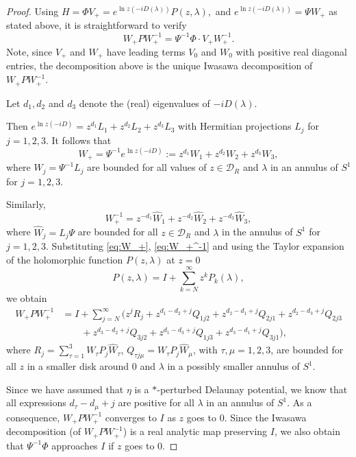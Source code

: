 \documentclass[a4paper,11pt]{amsart}
\theoremstyle{definition}
\numberwithin{equation}{section}
\begin{document}
\begin{proof}
Using  $H=\Phi V_+ =  e^{\ln z (-iD(\lambda))} P(z,\lambda),$ and 
$e^{\ln z (-iD(\lambda))}=\Psi W_+$ 
as  stated above, it is straightforward to verify
\begin{equation}\label{eq:4.8.2}
W_+PW_+^{-1}=\Psi^{-1}\Phi \cdot V_+W_+^{-1}.
\end{equation}
Note, since $V_+$ and $W_+$ have leading terms $V_0$ and $W_0$ with positive real diagonal entries, the decomposition above is the unique 
Iwasawa decomposition of $W_+PW_+^{-1}$.
 
Let  $d_1, d_2$ and $d_3$ denote the (real) eigenvalues of $-i D(\lambda).$

Then $e^{\ln z (-iD)}=z^{d_1}L_1+z^{d_2}L_2+z^{d_3}L_3$  with  Hermitian projections $L_j$ for $j=1,2,3$. 
It follows that 
\begin{equation}\label{eq:W_+}
W_+=\Psi^{-1}e^{\ln z (-iD)}:=z^{d_1}W_1+z^{d_2}W_2+z^{d_3}W_3,
\end{equation}
 where $W_j=\Psi^{-1}L_j$ are bounded for all values of $z\in\mathcal{D}_R$ and $\lambda$ in an annulus of $S^1$ for $j=1, 2, 3$. 
 
 Similarly, 
\begin{equation}\label{eq:W_+^-1}
W_+^{-1}=z^{-d_1} \hat{W}_1+z^{-d_2} \hat{W}_2+z^{-d_3} \hat{W}_3, 
\end{equation}
where $\hat{W}_j=L_j\Psi $ are bounded for all $z\in \mathcal{D}_R$ and $\lambda$ in the annulus of  $S^1$ for $j=1,2,3$. 
Substituting \eqref{eq:W_+}, \eqref{eq:W_+^-1} and  using the Taylor expansion of the 
holomorphic function $P(z, \lambda)$ at $z =0$
\begin{equation}
P(z,\lambda)=I+ \sum_{k=N}^{\infty }z^k P_k(\lambda),
\end{equation}
we obtain 
\begin{align*}
W_+PW_+^{-1}&=I+\sum_{j=N}^{\infty} ( z^j R_j + z^{d_1-d_2+j}Q_{1j2}+z^{d_2-d_1+j}Q_{2j1} 
+z^{d_2-d_3+j}Q_{2j3} \\
&\quad\quad +z^{d_3-d_2+j}Q_{3j2} +  z^{d_1-d_3+j}Q_{1j3}+ z^{d_3-d_1+j}Q_{3j1}),
\end{align*}
where $R_j=\sum_{\tau=1}^{3} W_{\tau}P_j\hat{W}_{\tau}$, $Q_{\tau j\mu}=W_{\tau}P_j \hat{W}_{\mu}$, with $\tau,\mu=1,2,3$, are bounded for all $z$ in a smaller disk around $0$ and $\lambda$ in a possibly smaller annulus of $S^1$.


Since we have assumed that $\eta$ is a $*$-perturbed Delaunay potential, we know that
all expressions $d_{\tau}-d_{\mu}+j$ are positive for all $\lambda$  in an annulus of $S^1$. As a consequence, $W_+PW_+^{-1}$ converges to $I$ as $z$ goes to $0$. Since the Iwasawa decomposition (of $W_+PW_+^{-1}$) is a real analytic map preserving $I$,  we also obtain that
$ \Psi^{-1}\Phi$ approaches  $I$ if $z$ goes to $0$.


\end{proof}
\end{document}
